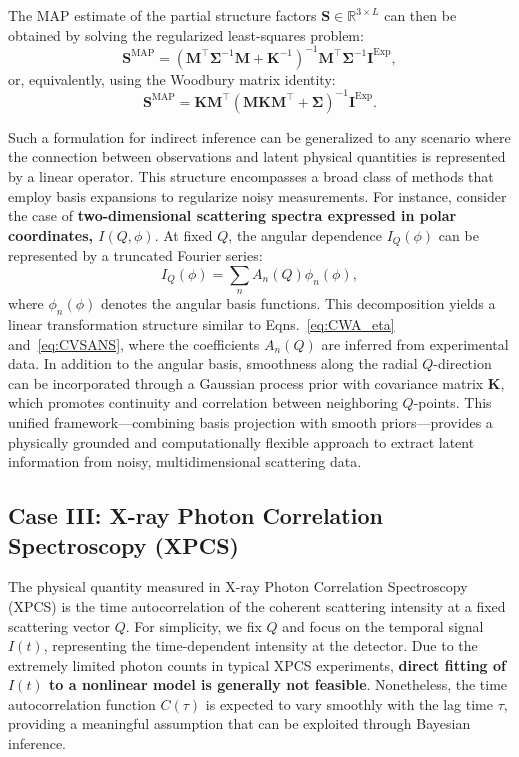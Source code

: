 \documentclass[12pt]{article}
\begin{document}
The MAP estimate of the partial structure factors \( \mathbf{S} \in \mathbb{R}^{3 \times L} \) can then be obtained by solving the regularized least-squares problem:
\begin{equation}
    \mathbf{S}^{\mathrm{MAP}} = \left( \mathbf{M}^\top \boldsymbol{\Sigma}^{-1} \mathbf{M} + \mathbf{K}^{-1} \right)^{-1} \mathbf{M}^\top \boldsymbol{\Sigma}^{-1} \mathbf{I}^{\mathrm{Exp}},
\end{equation}
or, equivalently, using the Woodbury matrix identity:
\begin{equation}
    \mathbf{S}^{\mathrm{MAP}} = \mathbf{K} \mathbf{M}^\top \left( \mathbf{M} \mathbf{K} \mathbf{M}^\top + \boldsymbol{\Sigma} \right)^{-1} \mathbf{I}^{\mathrm{Exp}}.
\end{equation}

Such a formulation for indirect inference can be generalized to any scenario where the connection between observations and latent physical quantities is represented by a linear operator. This structure encompasses a broad class of methods that employ basis expansions to regularize noisy measurements.
For instance, consider the case of \textbf{two-dimensional scattering spectra expressed in polar coordinates, \( I(Q, \phi) \)}. At fixed \( Q \), the angular dependence \( I_Q(\phi) \) can be represented by a truncated Fourier series:
\[
I_Q(\phi) = \sum_n A_n(Q) \phi_n(\phi),
\]
where \( \phi_n(\phi) \) denotes the angular basis functions. This decomposition yields a linear transformation structure similar to Eqns.~\eqref{eq:CWA_eta} and~\eqref{eq:CVSANS}, where the coefficients \( A_n(Q) \) are inferred from experimental data. 
In addition to the angular basis, smoothness along the radial \( Q \)-direction can be incorporated through a Gaussian process prior with covariance matrix \( \mathbf{K} \), which promotes continuity and correlation between neighboring \( Q \)-points. This unified framework—combining basis projection with smooth priors—provides a physically grounded and computationally flexible approach to extract latent information from noisy, multidimensional scattering data.

\subsection{Case III: X-ray Photon Correlation Spectroscopy (XPCS)}
The physical quantity measured in X-ray Photon Correlation Spectroscopy (XPCS) is the time autocorrelation of the coherent scattering intensity at a fixed scattering vector \( Q \). For simplicity, we fix \( Q \) and focus on the temporal signal \( I(t) \), representing the time-dependent intensity at the detector. Due to the extremely limited photon counts in typical XPCS experiments, \textbf{direct fitting of \( I(t) \) to a nonlinear model is generally not feasible}. Nonetheless, the time autocorrelation function \( C(\tau) \) is expected to vary smoothly with the lag time \( \tau \), providing a meaningful assumption that can be exploited through Bayesian inference.
\end{document}
